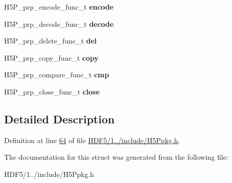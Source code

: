 \begin{DoxyCompactItemize}
H5\+P\+\_\+prp\+\_\+encode\+\_\+func\+\_\+t {\bfseries encode}
\item 
\mbox{\label{struct_h5_p__genprop__t_abe9f1b73feaab08efa854f5ee61a7507}} 
H5\+P\+\_\+prp\+\_\+decode\+\_\+func\+\_\+t {\bfseries decode}
\item 
\mbox{\label{struct_h5_p__genprop__t_abccdba4a8287d96b09d0314bcbd57906}} 
H5\+P\+\_\+prp\+\_\+delete\+\_\+func\+\_\+t {\bfseries del}
\item 
\mbox{\label{struct_h5_p__genprop__t_a5256ecbaa59b88649a463c61aa9e738b}} 
H5\+P\+\_\+prp\+\_\+copy\+\_\+func\+\_\+t {\bfseries copy}
\item 
\mbox{\label{struct_h5_p__genprop__t_a5eb41869cabc837269907dfbc782a65e}} 
H5\+P\+\_\+prp\+\_\+compare\+\_\+func\+\_\+t {\bfseries cmp}
\item 
\mbox{\label{struct_h5_p__genprop__t_a09860753561e7b61405079079a53eda2}} 
H5\+P\+\_\+prp\+\_\+close\+\_\+func\+\_\+t {\bfseries close}
\end{DoxyCompactItemize}


\subsection{Detailed Description}


Definition at line \hyperlink{_h_d_f5_21_810_81_2include_2_h5_ppkg_8h_source_l00064}{64} of file \hyperlink{_h_d_f5_21_810_81_2include_2_h5_ppkg_8h_source}{H\+D\+F5/1../include/\+H5\+Ppkg.\+h}.



The documentation for this struct was generated from the following file\+:\begin{DoxyCompactItemize}
\item 
H\+D\+F5/1../include/\+H5\+Ppkg.\+h\end{DoxyCompactItemize}
